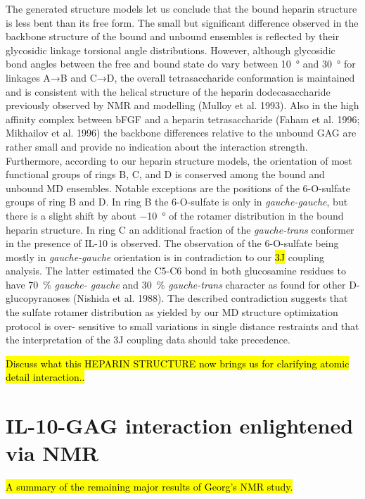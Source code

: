 The generated structure models let us conclude that the bound heparin structure
is less bent than its free form. The small but significant difference observed
in the backbone structure of the bound and unbound ensembles is reflected by
their glycosidic linkage torsional angle distributions. However, although
glycosidic bond angles between the free and bound state do vary between
\SI{10}{\degree} and \SI{30}{\degree} for linkages A→B and C→D, the overall
tetrasaccharide conformation is maintained and is consistent with the helical
structure of the heparin dodecasaccharide previously observed by NMR and
modelling (Mulloy et al. 1993). Also in the high affinity complex between bFGF
and a heparin tetrasaccharide (Faham et al. 1996; Mikhailov et al. 1996) the
backbone differences relative to the unbound GAG are rather small and provide no
indication about the interaction strength. Furthermore, according to our heparin
structure models, the orientation of most functional groups of rings B, C, and D
is conserved among the bound and unbound MD ensembles. Notable exceptions are
the positions of the 6-O-sulfate groups of ring B and D. In ring B the
6-O-sulfate is only in \textit{gauche-gauche}, but there is a slight shift by
about \SI{-10}{\degree} of the rotamer distribution in the bound heparin
structure. In ring C an additional fraction of the \textit{gauche-trans}
conformer in the presence of IL-10 is observed. The observation of the
6-O-sulfate being mostly in \textit{gauche-gauche} orientation is in
contradiction to our \hl{3J} coupling analysis. The latter estimated the C5-C6
bond in both glucosamine residues to have \SI{70}{\percent} \textit{gauche-
gauche} and \SI{30}{\percent} \textit{gauche-trans} character as found for other
D-glucopyranoses (Nishida et al. 1988). The described contradiction suggests
that the sulfate rotamer distribution as yielded by our MD structure
optimization protocol is over- sensitive to small variations in single distance
restraints and that the interpretation of the 3J coupling data should take
precedence.


\hl{Discuss what this HEPARIN STRUCTURE now brings us for clarifying atomic
detail interaction..}


\section{IL-10-GAG interaction enlightened via NMR}
\hl{A summary of the remaining major results of Georg's NMR study.}
\lipsum[1]


